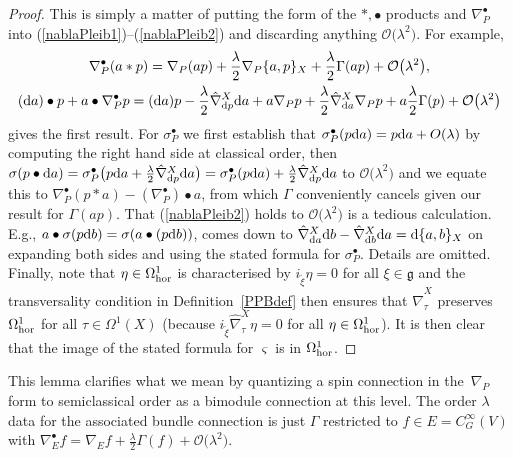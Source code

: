 \documentclass[10pt,a4paper]{amsart}
\numberwithin{equation}{section}
\newcommand{\<}{{\langle}}
\renewcommand{\>}{{\rangle}}
\newcommand{\extd}{{\rm d}}
\newcommand{\cg}{{\mathfrak{g}}}
\begin{document}
\begin{proof} This is simply a matter of putting the form of the $*,\bullet$ products and $\nabla^\bullet_{P}$ into (\ref{nablaPleib1})--(\ref{nablaPleib2}) and discarding anything $\mathcal{O}\big(\lambda^2\big)$. For example,
\begin{gather*} \nabla^\bullet_{P}(a*p) =\nabla_P(ap)+{\lambda\over 2}\nabla_P\{a,p\}_X+{\lambda\over 2}\Gamma(ap)+ \mathcal{O}\big(\lambda^2\big),\\
 (\extd a)\bullet p+a\bullet\nabla^\bullet_{P}p =(\extd a)p-{\lambda\over 2}\hat\nabla^X_{\extd p}\extd a+a\nabla_P p+{\lambda\over 2}\hat\nabla^X_{\extd a}\nabla_Pp+a{\lambda\over 2}\Gamma(p)+ \mathcal{O}\big(\lambda^2\big)\end{gather*}
 gives the first result. For $\sigma_P^\bullet$ we first establish that $\sigma_P^\bullet(p\extd a)=p\extd a+O(\lambda)$ by computing the right hand side at classical order, then $\sigma(p\bullet\extd a)=\sigma_P^\bullet\big(p\extd a+{\lambda\over 2}\hat\nabla^X_{\extd p}\extd a\big)=\sigma_P^\bullet(p\extd a)+{\lambda\over 2}\hat\nabla^X_{\extd p}\extd a$ to $\mathcal{O}\big(\lambda^2\big)$ and we equate this to $\nabla^\bullet_{P}(p*a)-(\nabla^\bullet_{P})\bullet a$, from which $\Gamma$ conveniently cancels given our result for $\Gamma(ap)$. That (\ref{nablaPleib2}) holds to $\mathcal{O}\big(\lambda^2\big)$ is a tedious calculation. E.g., $a\bullet\sigma(p\extd b)=\sigma(a\bullet(p\extd b))$, comes down to $\hat\nabla^X_{\extd a}\extd b-\hat\nabla^X_{\extd b}\extd a=\extd\{a,b\}_X$ on expanding both sides and using the stated formula for $\sigma_P^\bullet$. Details are omitted. Finally, note that $\eta\in \Omega^1_{\rm hor}$ is characterised by $i_{\tilde\xi}\eta=0$ for all $\xi\in \cg$ and the transversality condition in Definition~\ref{PPBdef} then ensures that $\hat\nabla^X_\tau$ preserves $\Omega^1_{\rm hor}$ for all $\tau\in \Omega^1(X)$ (because $i_{\tilde\xi}\hat\nabla^X_\tau\eta=0$ for all $\eta\in \Omega^1_{\rm hor}$). It is then clear that the image of the stated formula for $\varsigma$ is in $\Omega^1_{\rm hor}$. \end{proof}

This lemma clarifies what we mean by quantizing a spin connection in the~$\nabla_P$ form to semiclassical order as a bimodule connection at this level. The order $\lambda$ data for the associated bundle connection is just $\Gamma$ restricted to $f\in E=C^\infty_G(V)$ with $\nabla_E^\bullet f= \nabla_E f+\frac{\lambda}{2} \Gamma(f)+\mathcal{O}\big(\lambda^2\big)$.
\end{document}
